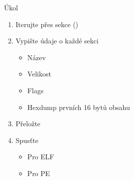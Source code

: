\begin{frame}{Úkol}

  \begin{enumerate}
    \item Iterujte přes sekce ()
    \item Vypište údaje o každé sekci
    \begin{itemize}
      \item Název
      \item Velikost
      \item Flags
      \item Hexdump prvních 16 bytů obsahu
    \end{itemize}
    \item Přeložte
    \item Spusťte
    \begin{itemize}
      \item Pro ELF
      \item Pro PE
    \end{itemize}
  \end{enumerate}

\end{frame}
